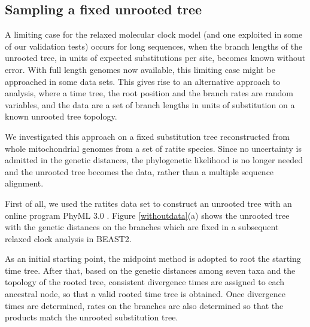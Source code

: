 \documentclass{bmcart}
\begin{document}
\subsection*{Sampling a fixed unrooted tree}

A limiting case for the relaxed molecular clock model (and one exploited in some of our validation tests) occurs for long sequences, when the branch lengths of the unrooted tree, in units of expected substitutions per site, becomes known without error.  With full length genomes now available, this limiting case might be approached in some data sets. This gives rise to an alternative approach to analysis, where a time tree, the root position and the branch rates are random variables, and the data are a set of branch lengths in units of substitution on a known unrooted tree topology.

We investigated this approach on a fixed substitution tree reconstructed from whole mitochondrial genomes from a set of ratite species. Since no uncertainty is admitted in the genetic distances, the phylogenetic likelihood is no longer needed and the unrooted tree becomes the data, rather than a multiple sequence alignment.

First of all, we used the ratites data set to construct an unrooted tree with an online program PhyML 3.0 \cite{phyml,guindon2010new}.  Figure \ref{withoutdata}(a) shows the unrooted tree with the genetic distances on the branches which are fixed in a subsequent relaxed clock analysis in BEAST2.

As an initial starting point, the midpoint method is adopted to root the starting time tree. After that, based on the genetic distances among seven taxa and the topology of the rooted tree, consistent divergence times are assigned to each ancestral node, so that a valid rooted time tree is obtained. Once divergence times are determined, rates on the branches are also determined so that the products match the unrooted substitution tree.
\end{document}
